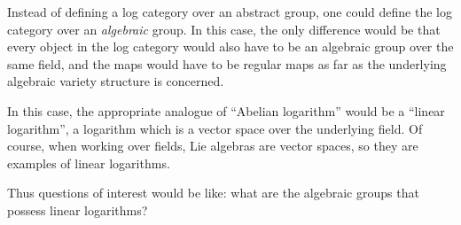 \documentclass[a4paper]{amsart}
\begin{document}
Instead of defining a log category over an abstract group, one could
define the log category over an {\em algebraic} group. In this case,
the only difference would be that every object in the log category
would also have to be an algebraic group over the same field, and the
maps would have to be regular maps as far as the underlying algebraic
variety structure is concerned.

In this case, the appropriate analogue of ``Abelian logarithm'' would
be a ``linear logarithm'', a logarithm which is a vector space over
the underlying field. Of course, when working over fields, Lie
algebras are vector spaces, so they are examples of linear logarithms.

Thus questions of interest would be like: what are the algebraic groups
that possess linear logarithms?


\printindex
\end{document}
